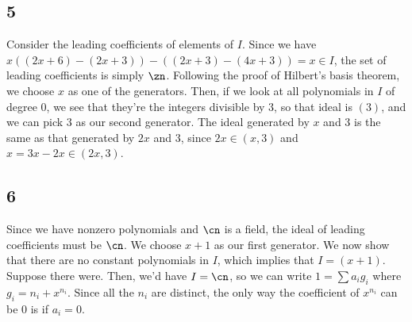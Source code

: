 \documentclass{article}
\begin{document}
\subsection*{5}
Consider the leading coefficients of elements of $I$. Since we have $x((2x+6)-(2x+3))-((2x+3)-(4x+3))=x\in I$, the set of leading coefficients is simply $\zn$. Following the proof of Hilbert's basis theorem, we choose $x$ as one of the generators. Then, if we look at all polynomials in $I$ of degree $0$, we see that they're the integers divisible by $3$, so that ideal is $(3)$, and we can pick $3$ as our second generator. The ideal generated by $x$ and $3$ is the same as that generated by $2x$ and $3$, since $2x\in(x,3)$ and $x=3x-2x\in(2x,3)$.
\subsection*{6}
Since we have nonzero polynomials and $\cn$ is a field, the ideal of leading coefficients must be $\cn$. We choose $x+1$ as our first generator. We now show that there are no constant polynomials in $I$, which implies that $I=(x+1)$. Suppose there were. Then, we'd have $I=\cn$, so we can write $1=\sum a_ig_i$ where $g_i=n_i+x^{n_i}$. Since all the $n_i$ are distinct, the only way the coefficient of $x^{n_i}$ can be $0$ is if $a_i=0$. 
\end{document}

